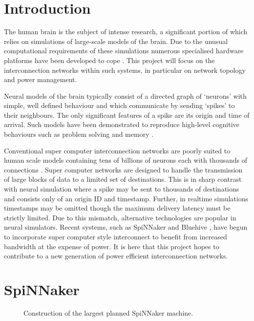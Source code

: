 \section{Introduction}

The human brain is the subject of intense research, a significant portion of
which relies on simulations of large-scale models of the brain. Due to the
unusual computational requirements of these simulations numerous specialised
hardware platforms have been developed to cope
\cite{furber07,moore12,maguire07,choudhary12,misra10}. This project will focus
on the interconnection networks within such systems, in particular on network
topology and power management.

Neural models of the brain typically consist of a directed graph of `neurons'
with simple, well defined behaviour and which communicate by sending `spikes'
to their neighbours. The only significant features of a spike are its origin and
time of arrival. Such models have been demonstrated to reproduce high-level
cognitive behaviours such as problem solving and memory \cite{eliasmith12}. 

Conventional super computer interconnection networks are poorly suited to human
scale models containing tens of billions of neurons \cite{williams88} each with
thousands of connections \cite{kung88}. Super computer networks are designed to
handle the transmission of large blocks of data to a limited set of
destinations. This is in sharp contrast with neural simulation where a spike may
be sent to thousands of destinations and consists only of an origin ID and
timestamp. Further, in realtime simulations timestamps may be omitted though the
maximum delivery latency must be strictly limited. Due to this mismatch,
alternative technologies are popular in neural simulators. Recent systems, such
as SpiNNaker \cite{furber07} and Bluehive \cite{moore12}, have begun to
incorporate super computer style interconnect to benefit from increased
bandwidth at the expense of power. It is here that this project hopes to
contribute to a new generation of power efficient interconnection networks.

\section{SpiNNaker}
	
	\begin{figure}
		\center
		
		
		\caption{Construction of the largest planned SpiNNaker machine.}
		\label{fig:spinnaker-abstractions}
	\end{figure}
	
